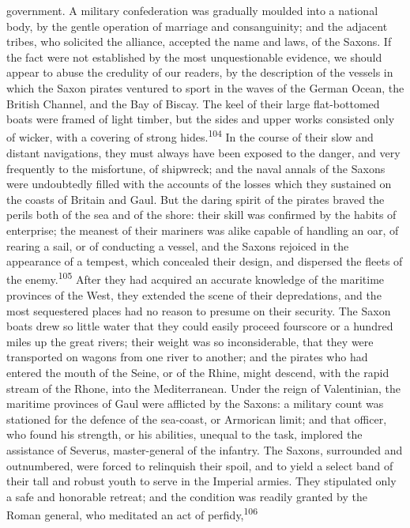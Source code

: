 {{{{{{{{{{{{{{{{{{{{{{{{{{{{{{{{{{{{{{{{{{{{{{{{{{{{{{{{{{{{{{{{{{{{{{{{{{{{{{{{{{{{{{{{{{{{{{{{{{{{{{{{{{{{{{{government. A military confederation was gradually moulded into a
national body, by the gentle operation of marriage and
consanguinity; and the adjacent tribes, who solicited the
alliance, accepted the name and laws, of the Saxons. If the fact
were not established by the most unquestionable evidence, we
should appear to abuse the credulity of our readers, by the
description of the vessels in which the Saxon pirates ventured to
sport in the waves of the German Ocean, the British Channel, and
the Bay of Biscay. The keel of their large flat-bottomed boats
were framed of light timber, but the sides and upper works
consisted only of wicker, with a covering of strong hides.\textsuperscript{104} In
the course of their slow and distant navigations, they must
always have been exposed to the danger, and very frequently to
the misfortune, of shipwreck; and the naval annals of the Saxons
were undoubtedly filled with the accounts of the losses which
they sustained on the coasts of Britain and Gaul. But the daring
spirit of the pirates braved the perils both of the sea and of
the shore: their skill was confirmed by the habits of enterprise;
the meanest of their mariners was alike capable of handling an
oar, of rearing a sail, or of conducting a vessel, and the Saxons
rejoiced in the appearance of a tempest, which concealed their
design, and dispersed the fleets of the enemy.\textsuperscript{105} After they had
acquired an accurate knowledge of the maritime provinces of the
West, they extended the scene of their depredations, and the most
sequestered places had no reason to presume on their security.
The Saxon boats drew so little water that they could easily
proceed fourscore or a hundred miles up the great rivers; their
weight was so inconsiderable, that they were transported on
wagons from one river to another; and the pirates who had entered
the mouth of the Seine, or of the Rhine, might descend, with the
rapid stream of the Rhone, into the Mediterranean. Under the
reign of Valentinian, the maritime provinces of Gaul were
afflicted by the Saxons: a military count was stationed for the
defence of the sea-coast, or Armorican limit; and that officer,
who found his strength, or his abilities, unequal to the task,
implored the assistance of Severus, master-general of the
infantry. The Saxons, surrounded and outnumbered, were forced to
relinquish their spoil, and to yield a select band of their tall
and robust youth to serve in the Imperial armies. They stipulated
only a safe and honorable retreat; and the condition was readily
granted by the Roman general, who meditated an act of perfidy,\textsuperscript{106}
}}}}}}}}}}}}}}}}}}}}}}}}}}}}}}}}}}}}}}}}}}}}}}}}}}}}}}}}}}}}}}}}}}}}}}}}}}}}}}}}}}}}}}}}}}}}}}}}}}}}}}}}}}}}}}}
